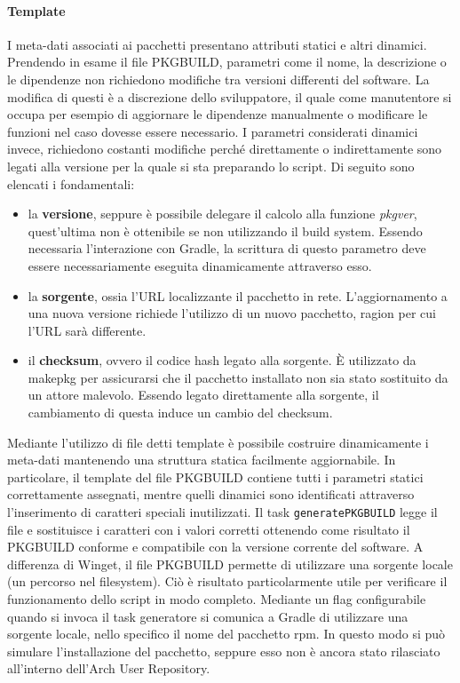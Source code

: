 \paragraph{Template} I meta-dati associati ai pacchetti presentano attributi statici e altri dinamici. Prendendo in esame il file PKGBUILD, parametri come il nome, la descrizione o le dipendenze non richiedono modifiche tra versioni differenti del software. La modifica di questi è a discrezione dello sviluppatore, il quale come manutentore si occupa per esempio di aggiornare le dipendenze manualmente o modificare le funzioni nel caso dovesse essere necessario. I parametri considerati dinamici invece, richiedono costanti modifiche perché direttamente o indirettamente sono legati alla versione per la quale si sta preparando lo script. Di seguito sono elencati i fondamentali:
\begin{itemize}
	\item la \textbf{versione}, seppure è possibile delegare il calcolo alla funzione \textit{pkgver}, quest'ultima non è ottenibile se non utilizzando il build system. Essendo necessaria l'interazione con Gradle, la scrittura di questo parametro deve essere necessariamente eseguita dinamicamente attraverso esso.
	\item la \textbf{sorgente}, ossia l'URL localizzante il pacchetto in rete. L'aggiornamento a una nuova versione richiede l'utilizzo di un nuovo pacchetto, ragion per cui l'URL sarà differente.
	\item il \textbf{checksum}, ovvero il codice hash legato alla sorgente. È utilizzato da makepkg per assicurarsi che il pacchetto installato non sia stato sostituito da un attore malevolo. Essendo legato direttamente alla sorgente, il cambiamento di questa induce un cambio del checksum.
\end{itemize}
Mediante l'utilizzo di file detti template è possibile costruire dinamicamente i meta-dati mantenendo una struttura statica facilmente aggiornabile. In particolare, il template del file PKGBUILD contiene tutti i parametri statici correttamente assegnati, mentre quelli dinamici sono identificati attraverso l'inserimento di caratteri speciali inutilizzati. Il task \texttt{generatePKGBUILD} legge il file e sostituisce i caratteri con i valori corretti ottenendo come risultato il PKGBUILD conforme e compatibile con la versione corrente del software. A differenza di Winget, il file PKGBUILD permette di utilizzare una sorgente locale (un percorso nel filesystem). Ciò è risultato particolarmente utile per verificare il funzionamento dello script in modo completo. Mediante un flag configurabile quando si invoca il task generatore si comunica a Gradle di utilizzare una sorgente locale, nello specifico il nome del pacchetto rpm. In questo modo si può simulare l'installazione del pacchetto, seppure esso non è ancora stato rilasciato all'interno dell'Arch User Repository.

